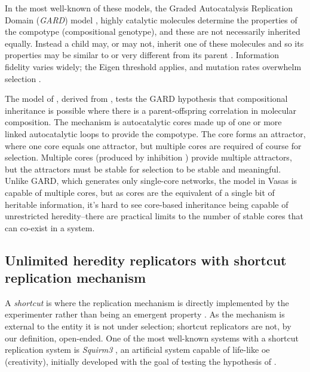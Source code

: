 
In the most well-known of these models, the Graded Autocatalysis Replication Domain (\emph{GARD}) model \parencite{Segre1998}, highly catalytic molecules determine the properties of the compotype (compositional genotype), and these are not necessarily inherited equally. Instead a child may, or may not, inherit one of these molecules and so its properties may be similar to or very different from its parent \parencite{Vasas2015, Vasas2012, Vasas2012a}. Information fidelity varies widely; the Eigen threshold \parencite{Eigen1971} applies, and mutation rates overwhelm selection \parencite{Vasas2015, Vasas2012, Vasas2012a}.


The model of \cite{Vasas2015, Vasas2012, Vasas2012a}, derived from \cite{Farmer1986}, tests the GARD hypothesis that compositional inheritance is possible where there is a parent-offspring correlation in molecular composition. The mechanism is autocatalytic cores made up of one or more linked autocatalytic loops to provide the compotype. The core forms an attractor, where one core equals one attractor, but multiple cores are required of course for selection. Multiple cores (produced by inhibition \textcite{Vasas2012a}) provide multiple attractors, but the attractors must be stable for selection to be stable and meaningful. Unlike GARD, which generates only single-core networks, the model in Vasas is capable of multiple cores, but as cores are the equivalent of a single bit of heritable information, it's hard to see core-based inheritance being capable of unrestricted heredity--there are practical limits to the number of stable cores that can co-exist in a system. 

\subsection{Unlimited heredity replicators with shortcut replication mechanism}

A \emph{shortcut} is where the replication mechanism is directly implemented by the experimenter rather than being an emergent property \parencite{BanzhafBaumgaertnerBeslonEtAl2016}. As the mechanism is external to the entity it is not under selection; shortcut replicators are not, by our definition, open-ended. One of the most well-known systems with a shortcut replication system is \emph{Squirm3} \parencite{Hutton2007,Hutton2002}, an artificial system capable of life-like \gls{oe} (creativity), initially developed with the goal of testing the hypothesis of \textcite{Taylor2001} \parencite[p.341]{Hutton2002}.

